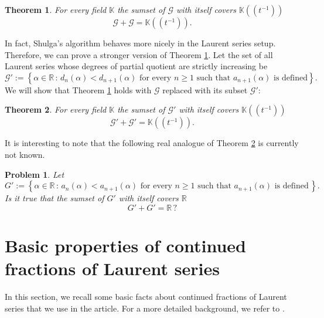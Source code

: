 \documentclass[a4paper,12pt]{article}
\newtheorem{thm}{Theorem}
\newtheorem*{prob*}{Problem}
\def\fq{\bbk}
\def\fttt{\fq\!\left(\!\left(t^{-1}\right)\!\right)}
\def\sep{\,:\,}
\def\defeq{:=}
\def\bbr{\mathbb{R}}
\def\bbk{\mathbb{K}}
\def\calg{\mathcal{G}}
\def\defeq{:=}
\begin{document}
\begin{thm}\label{thm:G_analogue}
For every field $\fq$ the sumset of $\calg$ with itself covers $\fttt$
\begin{equation*}%
\calg+\calg = \fttt.
\end{equation*}
\end{thm}

In fact, Shulga's algorithm behaves more nicely in the Laurent series setup. Therefore, we can prove a stronger version of Theorem \ref{thm:G_analogue}. Let the set of all Laurent series whose degrees of partial quotient are strictly increasing be
\begin{equation*}
\calg'\defeq\left\{\alpha\in\bbr\sep d_{n}(\alpha)<d_{n+1}(\alpha) \textrm{ for every $n\geq1$ such that $a_{n+1}(\alpha)$ is defined}\right\}.
\end{equation*}
We will show that Theorem \ref{thm:G_analogue} holds with $\calg$ replaced with its subset $\calg'$:

\begin{thm}\label{thm:Gprime_analogue}
For every field $\fq$ the sumset of $\calg'$ with itself covers $\fttt$
\begin{equation*}%
\calg'+\calg' = \fttt.
\end{equation*}
\end{thm}

It is interesting to note that the following real analogue of Theorem \ref{thm:Gprime_analogue} is currently not known.
\begin{prob*}
Let 
\begin{equation*}
    G'\defeq\left\{\alpha\in\bbr\sep a_n(\alpha)<a_{n+1}(\alpha)\textrm{ for every $n\geq1$ such that $a_{n+1}(\alpha)$ is defined}\,\right\}.
\end{equation*}
Is it true that the sumset of $G'$ with itself covers $\bbr$
\begin{equation*}
G'+G' = \bbr\,?
\end{equation*}
\end{prob*}

\section{Basic properties of continued fractions of Laurent series}
\label{prelim_sec}
In this section, we recall some basic facts about continued fractions of Laurent series that we use in the article. For a more detailed background, we refer to \cite[Section 9]{thakur}. 
\end{document}
